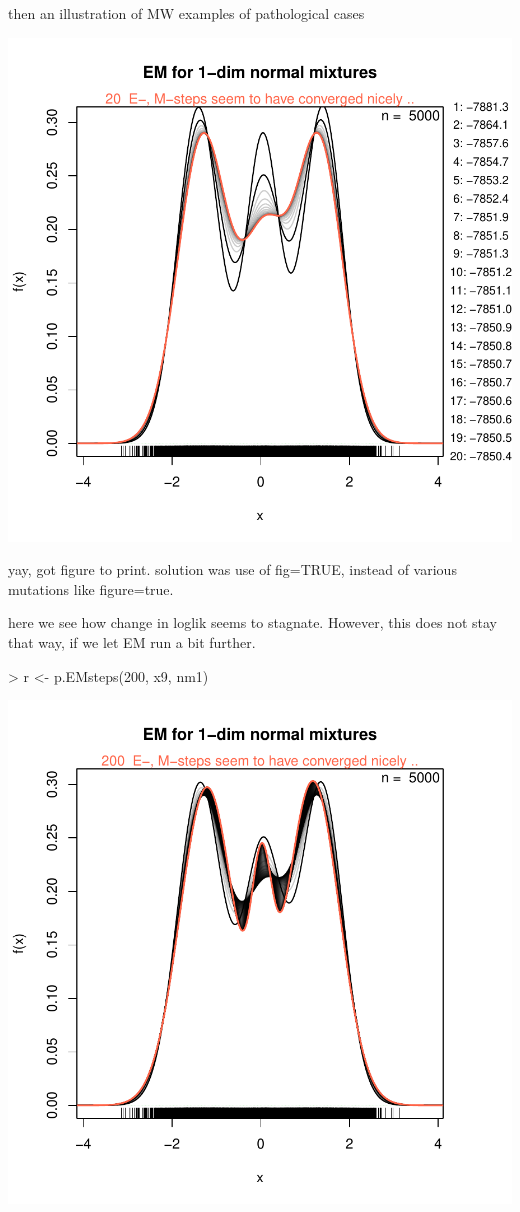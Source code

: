 then an illustration of MW examples of pathological cases


\includegraphics{chapter1-002}


yay, got figure to print. solution was use of fig=TRUE, instead of various mutations like figure=true.

here we see how change in loglik seems to stagnate. However, this does not stay that way, if we let EM run a bit further.

\begin{Schunk}
\begin{Sinput}
> r <- p.EMsteps(200, x9, nm1)
\end{Sinput}
\end{Schunk}
\includegraphics{chapter1-003}

